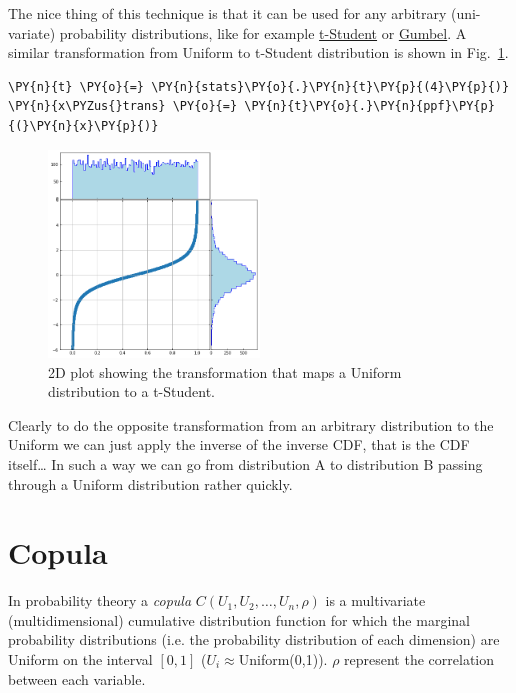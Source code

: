 The nice thing of this technique is that it can be used
for any arbitrary (uni-variate) probability distributions, like for
example \href{https://en.wikipedia.org/wiki/Student\%27s\_t-distribution}{t-Student}
or \href{https://en.wikipedia.org/wiki/Gumbel_distribution}{Gumbel}.
A similar transformation from Uniform to t-Student distribution is shown in Fig.~\ref{fig:uniform_to_tstudent}.

\begin{tcolorbox}[breakable, size=fbox, boxrule=1pt, pad at break*=1mm,colback=cellbackground, colframe=cellborder]
\begin{Verbatim}[commandchars=\\\{\}]
\PY{n}{t} \PY{o}{=} \PY{n}{stats}\PY{o}{.}\PY{n}{t}\PY{p}{(4}\PY{p}{)} 
\PY{n}{x\PYZus{}trans} \PY{o}{=} \PY{n}{t}\PY{o}{.}\PY{n}{ppf}\PY{p}{(}\PY{n}{x}\PY{p}{)}
\end{Verbatim}
\end{tcolorbox}

\begin{figure}[htbp]
  \centering
  \includegraphics[width=0.5\textwidth]{figures/lesson6_9_0.png}
  \caption{2D plot showing the transformation that maps a Uniform distribution to a t-Student.}
  \label{fig:uniform_to_tstudent}
\end{figure}

Clearly to do the opposite transformation from an arbitrary distribution
to the Uniform we can just apply the inverse of the inverse CDF, that is the CDF itself\ldots
In such a way we can go from distribution A to distribution B passing through 
a Uniform distribution rather quickly.

\section{Copula}\label{copula}

In probability theory a \emph{copula} \(C(U_1, U_2, \ldots, U_n, \rho)\)
is a multivariate (multidimensional) cumulative distribution function
for which the marginal probability distributions (i.e. the probability
distribution of each dimension) are Uniform on the
interval \([0, 1]\) (\(U_i \approx\)Uniform(0,1)).
\(\rho\) represent the correlation between each variable.

